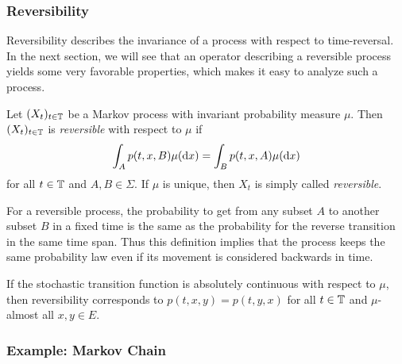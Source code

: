 
\subsubsection*{Reversibility}

Reversibility describes the invariance of a process with respect to time-reversal. 
In the next section, we will see that an operator describing a reversible process yields some very favorable properties, which makes it easy to analyze such a process.

\begin{defi}
Let $(X_t)_{t\in\mathbb{T}}$ be a Markov process with invariant probability measure $\mu$. Then $(X_t)_{t\in\mathbb{T}}$ is \textit{reversible} with respect to $\mu$ if
\begin{equation*}
\int_A p(t,x,B) \mu(\mathop{}\!\mathrm{d} x) = \int_B p(t,x,A) \mu(\mathop{}\!\mathrm{d} x)
\end{equation*}
for all $t \in \mathbb{T}$ and $A,B \in \Sigma$. If $\mu$ is unique, then $X_t$ is simply called \textit{reversible}.
\end{defi}

For a reversible process, the probability to get from any subset $A$ to another subset $B$ in a fixed time is the same as the probability for the reverse transition in the same time span.
Thus this definition implies that the process keeps the same probability law even if its movement is considered backwards in time.

If the stochastic transition function is absolutely continuous with respect to $\mu$, then reversibility corresponds to $p(t,x,y)=p(t,y,x)$ for all $t \in \mathbb{T}$ and $\mu$-almost all $x,y  \in E$.

\subsubsection*{Example: Markov Chain}


